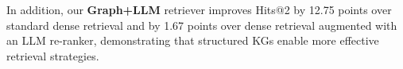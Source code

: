 \documentclass{article} %
\newcommand{\synthLlama}{\textrm{SynthKG-8b}}
\newcommand{\distilledLlama}{\textrm{D-SynthKG-8b}}
\begin{document}
In addition, our \textbf{Graph+LLM} retriever improves Hits@2 by 12.75 points over standard dense retrieval and by 1.67 points over dense retrieval augmented with an LLM re-ranker, demonstrating that structured KGs enable more effective retrieval strategies.


\end{document}
